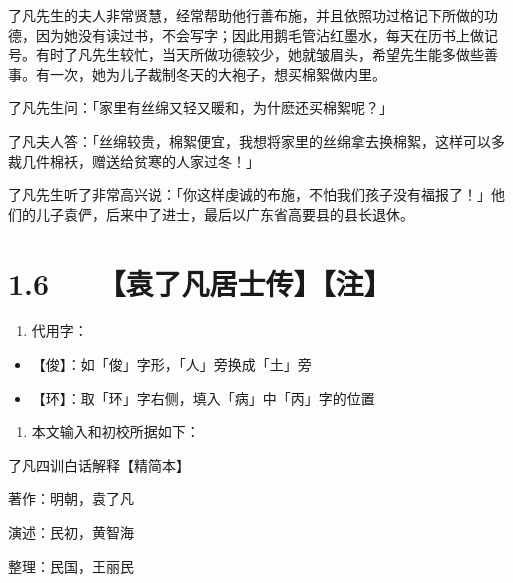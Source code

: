 \documentclass[letterpaper,12pt,english]{sphinxmanual}
\begin{document}
了凡先生的夫人非常贤慧，经常帮助他行善布施，并且依照功过格记下所做的功德，因为她没有读过书，不会写字；因此用鹅毛管沾红墨水，每天在历书上做记号。有时了凡先生较忙，当天所做功德较少，她就皱眉头，希望先生能多做些善事。有一次，她为儿子裁制冬天的大袍子，想买棉絮做内里。

了凡先生问：「家里有丝绵又轻又暖和，为什麽还买棉絮呢？」

了凡夫人答：「丝绵较贵，棉絮便宜，我想将家里的丝绵拿去换棉絮，这样可以多裁几件棉袄，赠送给贫寒的人家过冬！」

了凡先生听了非常高兴说：「你这样虔诚的布施，不怕我们孩子没有福报了！」他们的儿子袁俨，后来中了进士，最后以广东省高要县的县长退休。


\section{1.6   【袁了凡居士传】【注】}
\label{\detokenize{p00_u5176_u5b83/_u8881_u4e86_u51e1-_u4e86_u51e1_u56db_u8bad:id8}}\begin{enumerate}
%
\item {} 
代用字：

\end{enumerate}
\begin{itemize}
\item {} 
【俊】：如「俊」字形，「人」旁换成「土」旁

\item {} 
【环】：取「环」字右侧，填入「病」中「丙」字的位置

\end{itemize}
\begin{enumerate}
%
\setcounter{enumi}{1}
\item {} 
本文输入和初校所据如下：

\end{enumerate}

了凡四训白话解释【精简本】

著作：明朝，袁了凡

演述：民初，黄智海

整理：民国，王丽民
\end{document}
